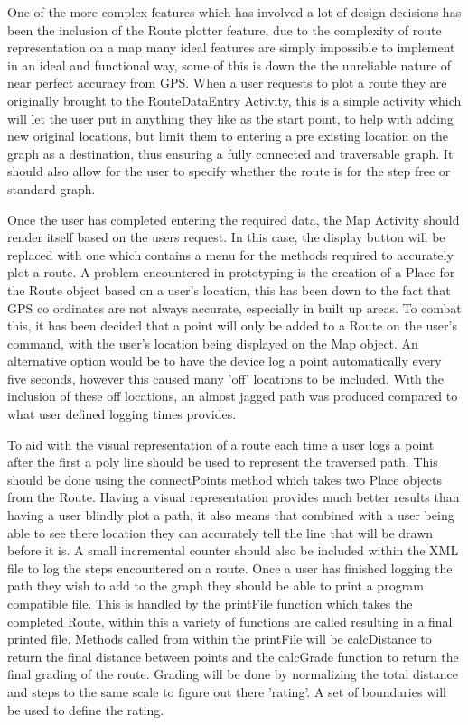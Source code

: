 One of the more complex features which has involved a lot of design decisions has been the inclusion of the Route plotter feature, due to the complexity of route representation on a map many ideal features are simply impossible to implement in an ideal and functional way, some of this is down the the unreliable nature of near perfect accuracy from GPS\cite{gps}. When a user requests to plot a route they are originally brought to the RouteDataEntry Activity, this is a simple activity which will let the user put in anything they like as the start point, to help with adding new original locations, but limit them to entering a pre existing location on the graph as a destination, thus ensuring a fully connected and traversable graph. It should also allow for the user to specify whether the route is for the step free or standard graph. 

Once the user has completed entering the required data, the Map Activity should render itself based on the users request. In this case, the display button will be replaced with one which contains a menu for the methods required to accurately plot a route. A problem encountered in prototyping is the creation of a Place for the Route object based on a user's location, this has been down to the fact that GPS co ordinates are not always accurate, especially in built up areas\cite{gps}. To combat this, it has been decided that a point will only be added to a Route on the user's command, with the user's location being displayed on the Map object. An alternative option would be to have the device log a point automatically every five seconds, however this caused many 'off' locations to be included. With the inclusion of these off locations, an almost jagged path was produced compared to what user defined logging times provides. 

To aid with the visual representation of a route each time a user logs a point after the first a poly line\cite{poly} should be used to represent the traversed path. This should be done using the connectPoints method which takes two Place objects from the Route. Having a visual representation provides much better results than having a user blindly plot a path, it also means that combined with a user being able to see there location they can accurately tell the line that will be drawn before it is. A small incremental counter should also be included within the XML file to log the steps encountered on a route. Once a user has finished logging the path they wish to add to the graph they should be able to print a program compatible file. This is handled by the printFile function which takes the completed Route, within this a variety of functions are called resulting in a final printed file. Methods called from within the printFile will be calcDistance to return the final distance between points and the calcGrade function to return the final grading of the route. Grading will be done by normalizing the total distance and steps to the same scale to figure out there 'rating'. A set of boundaries will be used to define the rating.

